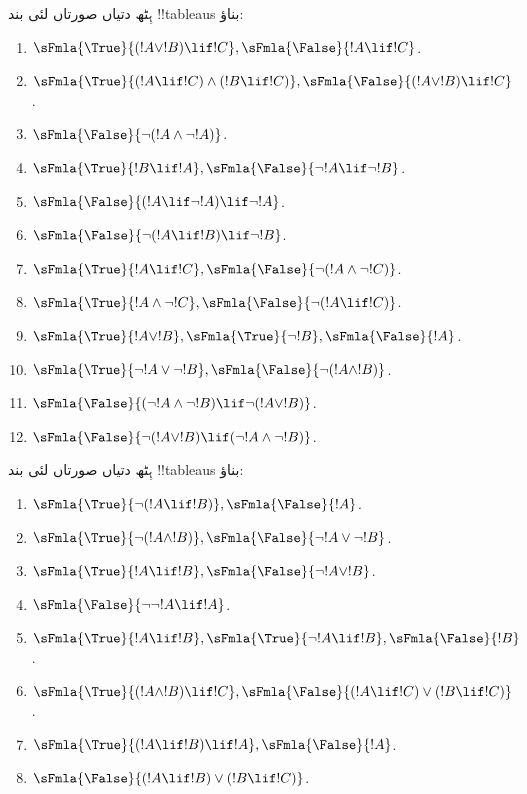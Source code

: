 \documentclass[../../../include/open-logic-section]{subfiles}
\begin{document}
\begin{prob}
ہِٹھ دتیاں صورتاں لئی بند !!{tableau}s بناؤ:
\begin{enumerate}
\item $\sFmla{\True}{(!A \lor !B) \lif !C}, \sFmla{\False}{!A \lif !C}$.
\item $\sFmla{\True}{(!A \lif !C) \land (!B \lif !C)}, \sFmla{\False}{(!A \lor !B) \lif !C}$.
\item $\sFmla{\False}{\lnot(!A \land \lnot !A)}$.
\item $\sFmla{\True}{!B \lif !A}, \sFmla{\False}{\lnot !A \lif \lnot !B}$.
\item $\sFmla{\False}{(!A \lif \lnot !A) \lif \lnot !A}$.
\item $\sFmla{\False}{\lnot(!A \lif !B) \lif \lnot !B}$.
\item $\sFmla{\True}{!A \lif !C}, \sFmla{\False}{\lnot (!A \land \lnot !C)}$.
\item $\sFmla{\True}{!A \land \lnot !C}, \sFmla{\False}{\lnot (!A \lif !C)}$.
\item $\sFmla{\True}{!A \lor !B}, \sFmla{\True}{\lnot !B}, \sFmla{\False}{!A}$.
\item $\sFmla{\True}{\lnot !A \lor \lnot !B}, \sFmla{\False}{\lnot(!A \land !B)}$.
\item $\sFmla{\False}{(\lnot !A \land \lnot !B) \lif\lnot(!A \lor !B)}$.
\item $\sFmla{\False}{\lnot(!A \lor !B) \lif (\lnot !A \land \lnot !B)}$.
\end{enumerate}
\end{prob}

\begin{prob}
ہِٹھ دتیاں صورتاں لئی بند !!{tableau}s بناؤ:
\begin{enumerate}
\item $\sFmla{\True}{\lnot(!A \lif !B)}, \sFmla{\False}{!A}$.
\item $\sFmla{\True}{\lnot(!A \land !B)}, \sFmla{\False}{\lnot !A \lor \lnot !B}$.
\item $\sFmla{\True}{!A \lif !B}, \sFmla{\False}{\lnot !A \lor !B}$.
\item $\sFmla{\False}{\lnot \lnot !A \lif !A}$.
\item $\sFmla{\True}{!A \lif !B}, \sFmla{\True}{\lnot !A \lif !B}, \sFmla{\False}{!B}$.
\item $\sFmla{\True}{(!A \land !B) \lif !C}, \sFmla{\False}{(!A \lif !C) \lor (!B \lif !C)}$.
\item $\sFmla{\True}{(!A \lif !B) \lif !A}, \sFmla{\False}{!A}$.
\item $\sFmla{\False}{(!A \lif !B) \lor (!B \lif !C)}$.
\end{enumerate}
\end{prob}
\end{document}
